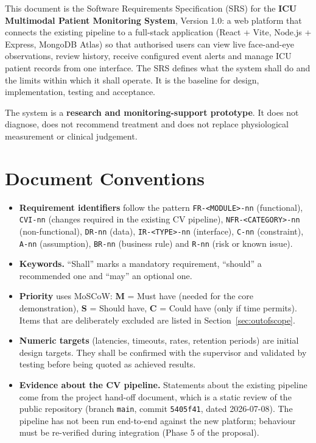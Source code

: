 \documentclass[a4paper,11pt]{scrreprt}
\newcommand{\code}[1]{\texttt{#1}}
\begin{document}
This document is the Software Requirements Specification (SRS) for the \textbf{ICU Multimodal Patient Monitoring System}, Version 1.0: a web platform that connects the existing pipeline to a full-stack application (React + Vite, Node.js + Express, MongoDB Atlas) so that authorised users can view live face-and-eye observations, review history, receive configured event alerts and manage ICU patient records from one interface. The SRS defines what the system shall do and the limits within which it shall operate. It is the baseline for design, implementation, testing and acceptance.

The system is a \textbf{research and monitoring-support prototype}. It does not diagnose, does not recommend treatment and does not replace physiological measurement or clinical judgement.

\section{Document Conventions}\label{sec:conventions}
\begin{itemize}
  \item \textbf{Requirement identifiers} follow the pattern \code{FR-<MODULE>-nn} (functional), \code{CVI-nn} (changes required in the existing CV pipeline), \code{NFR-<CATEGORY>-nn} (non-functional), \code{DR-nn} (data), \code{IR-<TYPE>-nn} (interface), \code{C-nn} (constraint), \code{A-nn} (assumption), \code{BR-nn} (business rule) and \code{R-nn} (risk or known issue).
  \item \textbf{Keywords.} ``Shall'' marks a mandatory requirement, ``should'' a recommended one and ``may'' an optional one.
  \item \textbf{Priority} uses MoSCoW: \textbf{M} = Must have (needed for the core demonstration), \textbf{S} = Should have, \textbf{C} = Could have (only if time permits). Items that are deliberately excluded are listed in Section~\ref{sec:outofscope}.
  \item \textbf{Numeric targets} (latencies, timeouts, rates, retention periods) are initial design targets. They shall be confirmed with the supervisor and validated by testing before being quoted as achieved results.
  \item \textbf{Evidence about the CV pipeline.} Statements about the existing pipeline come from the project hand-off document, which is a static review of the public repository (branch \code{main}, commit \code{5405f41}, dated 2026-07-08). The pipeline has not been run end-to-end against the new platform; behaviour must be re-verified during integration (Phase 5 of the proposal).
\end{itemize}
\end{document}
